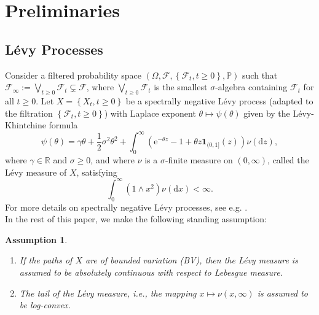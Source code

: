 \documentclass[10pt,a4paper]{amsart}
\newtheorem{assumption}{Assumption}[section]
\newcommand{\p}{\mathbb{P}}
\newcommand{\reals}{\mathbb{R}}
\newcommand{\ind}{\mathbf{1}}
\renewcommand{\geq}{\geqslant}
\begin{document}


\section{Preliminaries}\label{Sec:Preliminary}
\subsection{L\'evy Processes}
Consider a filtered probability space $\left( \Omega, \mathcal{F}, \left\lbrace \mathcal{F}_t, t \geq 0 \right\rbrace, \p \right)$ such that $\mathcal{F}_\infty := \bigvee_{t \geq 0} \mathcal{F}_t \subsetneq \mathcal{F}$, where $\bigvee_{t \geq 0} \mathcal{F}_t$ is the smallest $\sigma$-algebra containing $\mathcal{F}_t$ for all $t \geq 0$. Let $X=\left\lbrace X_t , t \geq 0 \right\rbrace$ be a spectrally negative Lévy process (adapted to the filtration $\left\lbrace \mathcal{F}_t, t \geq 0 \right\rbrace$) with Laplace exponent $\theta \mapsto \psi (\theta)$ given by the L\'evy-Khintchine formula
\begin{equation}\label{eq.Laplace}
\psi(\theta) = \gamma \theta + \frac{1}{2} \sigma^2 \theta^2 + \int^{\infty}_0 \left( \mathrm{e}^{-\theta z} - 1 + \theta z \ind_{(0,1]}(z) \right) \nu(\mathrm{d}z) ,
\end{equation}
where $\gamma \in \reals$ and $\sigma \geq 0$, and where $\nu$ is a $\sigma$-finite measure on $(0,\infty)$, called the L\'{e}vy measure of $X$, satisfying
\begin{equation*}
\int^{\infty}_0 (1 \wedge x^2) \nu(\mathrm{d}x) < \infty .
\end{equation*}
For more details on spectrally negative Lévy processes, see e.g.
\cite{kyprianou_2014}.\\
In the rest of this paper, we make the following standing assumption:
\begin{assumption}\label{standing-assumption}
	\begin{enumerate}
	\item If the paths of $X$ are of bounded variation (BV), then the Lévy measure is assumed to be absolutely continuous with respect to Lebesgue measure.
	\item The tail of the L\'evy measure, i.e., the mapping $x \mapsto \nu(x,\infty)$ is assumed to be log-convex.
	\end{enumerate}%
\end{assumption}
\end{document}

